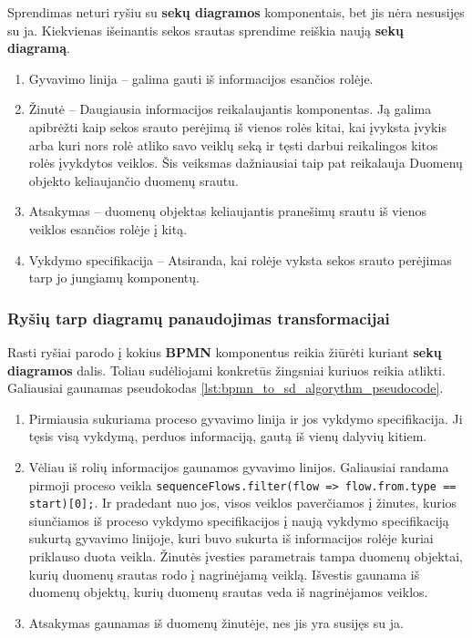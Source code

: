 \documentclass{VUMIFInfBakalaurinis}
\begin{document}
Sprendimas neturi ryšiu su \textbf{sekų diagramos} komponentais, bet jis nėra nesusijęs su ja. Kiekvienas išeinantis sekos srautas sprendime reiškia naują \textbf{sekų diagramą}. 
\begin{enumerate}
	\item Gyvavimo linija – galima gauti iš informacijos esančios rolėje. 
	\item Žinutė – Daugiausia informacijos reikalaujantis komponentas. Ją galima apibrėžti kaip sekos srauto perėjimą iš vienos rolės kitai, kai įvyksta įvykis arba kuri nors rolė atliko savo veiklų seką ir tęsti darbui reikalingos kitos rolės įvykdytos veiklos. Šis veiksmas dažniausiai taip pat reikalauja Duomenų objekto keliaujančio duomenų srautu.
	\item Atsakymas – duomenų objektas keliaujantis pranešimų srautu iš vienos veiklos esančios rolėje į kitą.
	\item Vykdymo specifikacija – Atsiranda, kai rolėje vyksta sekos srauto perėjimas tarp jo jungiamų komponentų.
\end{enumerate} 

\subsubsection{Ryšių tarp diagramų panaudojimas transformacijai}

Rasti ryšiai parodo į kokius \textbf{BPMN} komponentus reikia žiūrėti kuriant \textbf{sekų diagramos} dalis. Toliau sudėliojami konkretūs žingsniai kuriuos reikia atlikti. Galiausiai gaunamas pseudokodas \ref{lst:bpmn_to_sd_algorythm_pseudocode}. 


\begin{enumerate}
	\item Pirmiausia sukuriama proceso gyvavimo linija ir jos vykdymo specifikacija. Ji tęsis visą vykdymą, perduos informaciją, gautą iš vienų dalyvių kitiem. 
	\item Vėliau iš rolių informacijos gaunamos gyvavimo linijos. Galiausiai randama pirmoji proceso veikla \lstinline[columns=fixed]{sequenceFlows.filter(flow => flow.from.type == start)[0];}. Ir pradedant nuo jos, visos veiklos paverčiamos į žinutes, kurios siunčiamos iš proceso vykdymo specifikacijos į naują vykdymo specifikaciją sukurtą gyvavimo linijoje, kuri buvo sukurta iš informacijos rolėje kuriai priklauso duota veikla. Žinutės įvesties parametrais tampa duomenų objektai, kurių duomenų srautas rodo į nagrinėjamą veiklą. Išvestis gaunama iš duomenų objektų, kurių duomenų srautas veda iš nagrinėjamos veiklos. 
	\item Atsakymas gaunamas iš duomenų žinutėje, nes jis yra susijęs su ja. 
\end{enumerate} 
\end{document}
